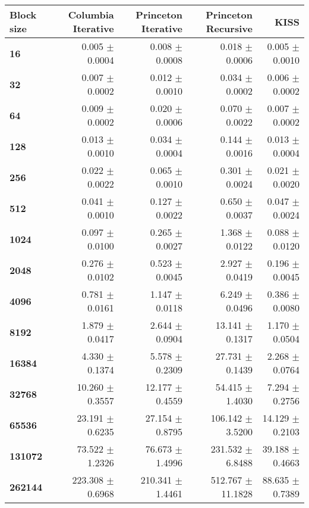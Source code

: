 \begin{tabular}{lrrrr}\toprule
    \textbf{Block size} & \textbf{Columbia Iterative} & \textbf{Princeton Iterative} & \textbf{Princeton Recursive} & \textbf{KISS}\\\midrule
\textbf{16}     & 0.005 $\pm$ 0.0004   & 0.008 $\pm$ 0.0008 & 0.018 $\pm$ 0.0006      & 0.005 $\pm$ 0.0010  \\
\textbf{32}     & 0.007 $\pm$ 0.0002   & 0.012 $\pm$ 0.0010 & 0.034 $\pm$ 0.0002      & 0.006 $\pm$ 0.0002  \\
\textbf{64}     & 0.009 $\pm$ 0.0002   & 0.020 $\pm$ 0.0006 & 0.070 $\pm$ 0.0022      & 0.007 $\pm$ 0.0002  \\
\textbf{128}    & 0.013 $\pm$ 0.0010   & 0.034 $\pm$ 0.0004 & 0.144 $\pm$ 0.0016      & 0.013 $\pm$ 0.0004  \\
\textbf{256}    & 0.022 $\pm$ 0.0022   & 0.065 $\pm$ 0.0010 & 0.301 $\pm$ 0.0024      & 0.021 $\pm$ 0.0020  \\
\textbf{512}    & 0.041 $\pm$ 0.0010   & 0.127 $\pm$ 0.0022 & 0.650 $\pm$ 0.0037      & 0.047 $\pm$ 0.0024  \\
\textbf{1024}   & 0.097 $\pm$ 0.0100   & 0.265 $\pm$ 0.0027 & 1.368 $\pm$ 0.0122      & 0.088 $\pm$ 0.0120  \\
\textbf{2048}   & 0.276 $\pm$ 0.0102   & 0.523 $\pm$ 0.0045 & 2.927 $\pm$ 0.0419      & 0.196 $\pm$ 0.0045  \\
\textbf{4096}   & 0.781 $\pm$ 0.0161   & 1.147 $\pm$ 0.0118 & 6.249 $\pm$ 0.0496      & 0.386 $\pm$ 0.0080  \\
\textbf{8192}   & 1.879 $\pm$ 0.0417   & 2.644 $\pm$ 0.0904 & 13.141 $\pm$ 0.1317     & 1.170 $\pm$ 0.0504  \\
\textbf{16384}  & 4.330 $\pm$ 0.1374   & 5.578 $\pm$ 0.2309 & 27.731 $\pm$ 0.1439     & 2.268 $\pm$ 0.0764  \\
\textbf{32768}  & 10.260 $\pm$ 0.3557  & 12.177 $\pm$ 0.4559 & 54.415 $\pm$ 1.4030    & 7.294 $\pm$ 0.2756  \\
\textbf{65536}  & 23.191 $\pm$ 0.6235  & 27.154 $\pm$ 0.8795 & 106.142 $\pm$ 3.5200   & 14.129 $\pm$ 0.2103 \\
\textbf{131072} & 73.522 $\pm$ 1.2326  & 76.673 $\pm$ 1.4996 & 231.532 $\pm$ 6.8488   & 39.188 $\pm$ 0.4663 \\
\textbf{262144} & 223.308 $\pm$ 0.6968 & 210.341 $\pm$ 1.4461 & 512.767 $\pm$ 11.1828 & 88.635 $\pm$ 0.7389 \\
\bottomrule
\end{tabular}
